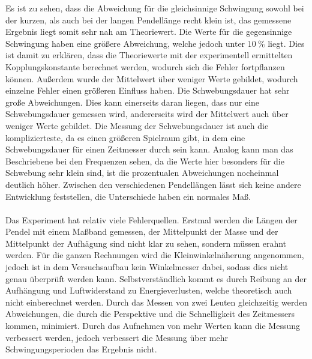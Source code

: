 \noindent Es ist zu sehen, dass die Abweichung für die gleichsinnige Schwingung sowohl bei der kurzen, als auch bei der langen Pendellänge recht klein ist, das
gemessene Ergebnis liegt somit sehr nah am Theoriewert. Die Werte für die gegensinnige Schwingung haben eine größere Abweichung, welche jedoch unter $\SI{10}{\percent}$
liegt. Dies ist damit zu erklären, dass die Theoriewerte mit der experimentell ermittelten Kopplungskonstante berechnet werden, wodurch sich die Fehler fortpflanzen 
können. Außerdem wurde der Mittelwert über weniger Werte gebildet, wodurch einzelne Fehler einen größeren Einfluss haben.
Die Schwebungsdauer hat sehr große Abweichungen. Dies kann einerseits daran liegen, dass nur eine Schwebungsdauer gemessen wird, andererseits wird der Mittelwert
auch über weniger Werte gebildet. Die Messung der Schwebungsdauer ist auch die komplizierteste, da es einen größeren Spielraum gibt, in dem eine Schwebungsdauer
für einen Zeitmesser durch sein kann.  
Analog kann man das Beschriebene bei den Frequenzen sehen, da die Werte hier besonders für die Schwebung sehr klein sind, ist die
prozentualen Abweichungen nocheinmal deutlich höher. Zwischen den verschiedenen Pendellängen lässt sich keine andere Entwicklung feststellen, die Unterschiede haben
ein normales Maß. \\ \\

\noindent Das Experiment hat relativ viele Fehlerquellen. Erstmal werden die Längen der Pendel mit einem Maßband gemessen, der Mittelpunkt der Masse und
der Mittelpunkt der Aufhägung sind nicht klar zu sehen, sondern müssen erahnt werden. Für die ganzen Rechnungen wird die Kleinwinkelnäherung angenommen, jedoch ist in dem 
Versuchsaufbau kein Winkelmesser dabei, sodass dies nicht genau überprüft werden kann. Selbstverständlich kommt es durch Reibung an der Aufhängung und 
Luftwiderstand zu Energieverlusten, welche theoretisch auch nicht einberechnet werden. Durch das Messen von zwei Leuten gleichzeitig werden Abweichungen, die durch
die Perspektive und die Schnelligkeit des Zeitmessers kommen, minimiert. Durch das Aufnehmen von mehr Werten kann die Messung verbessert werden, jedoch verbessert
die Messung über mehr Schwingungsperioden das Ergebnis nicht. 